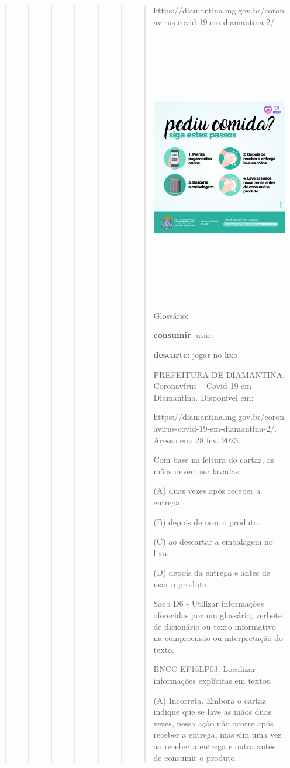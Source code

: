 \begin{quote}
\begin{quote}
\begin{quote}
\begin{quote}
\begin{quote}
\begin{quote}
\begin{quote}
https://diamantina.mg.gov.br/coronavirus-covid-19-em-diamantina-2/

\includegraphics[width=4.68750in,height=4.68750in]{media/image36.png}

Glossário:

\textbf{consumir}: usar.

\textbf{descarte}: jogar no lixo.

PREFEITURA DE DIAMANTINA. Coronavírus -- Covid-19 em Diamantina.
Disponível em:

https://diamantina.mg.gov.br/coronavirus-covid-19-em-diamantina-2/.
Acesso em: 28 fev. 2023.

Com base na leitura do cartaz, as mãos devem ser lavadas

(A) duas vezes após receber a entrega.

(B) depois de usar o produto.

(C) ao descartar a embalagem no lixo.

(D) depois da entrega e antes de usar o produto.

Saeb D6 - Utilizar informações oferecidas por um glossário, verbete de
dicionário ou texto informativo na compreensão ou interpretação do
texto.

BNCC EF15LP03: Localizar informações explícitas em textos.

(A) Incorreta. Embora o cartaz indique que se lave as mãos duas vezes,
nessa ação não ocorre após receber a entrega, mas sim uma vez ao receber
a entrega e outra antes de consumir o produto.


\end{quote}
\end{quote}
\end{quote}
\end{quote}
\end{quote}
\end{quote}
\end{quote}
